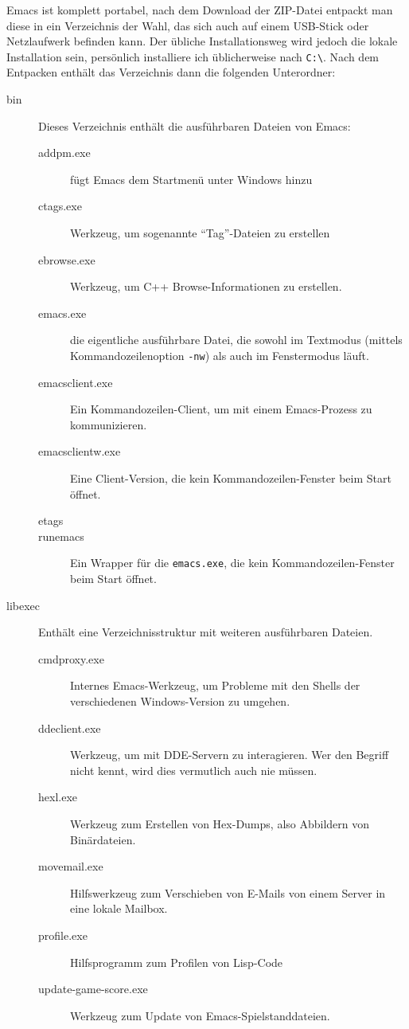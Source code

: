 \documentclass[12pt,ngerman]{scrbook}
\begin{document}
Emacs ist komplett portabel, nach dem Download der ZIP-Datei entpackt man diese in ein Verzeichnis der Wahl, das sich auch auf einem USB-Stick oder Netzlaufwerk befinden kann.
Der übliche Installationsweg wird jedoch die lokale Installation sein, persönlich installiere ich üblicherweise nach \texttt{C:\textbackslash}. Nach dem Entpacken enthält das Verzeichnis dann die folgenden Unterordner:

\begin{description}
\item[bin] Dieses Verzeichnis enthält die ausführbaren Dateien von Emacs:

\begin{description}
\item[addpm.exe] fügt Emacs dem Startmenü unter Windows hinzu
\item[ctags.exe] Werkzeug, um sogenannte \enquote{Tag}-Dateien zu erstellen 
\item[ebrowse.exe] Werkzeug, um C++ Browse-Informationen zu erstellen.
\item[emacs.exe] die eigentliche ausführbare Datei, die sowohl im Textmodus (mittels Kommandozeilenoption \texttt{-nw}) als auch im Fenstermodus läuft. 
\item[emacsclient.exe] Ein Kommandozeilen-Client, um mit einem Emacs-Prozess zu kommunizieren.
\item[emacsclientw.exe] Eine Client-Version, die kein Kommandozeilen-Fenster beim Start öffnet.
\item[etags]
\item[runemacs] Ein Wrapper für die \texttt{emacs.exe}, die kein Kommandozeilen-Fenster beim Start öffnet.
\end{description}


\item[libexec] Enthält eine Verzeichnisstruktur mit weiteren ausführbaren Dateien.

\begin{description}
\item[cmdproxy.exe] Internes Emacs-Werkzeug, um Probleme mit den Shells der verschiedenen Windows-Version zu umgehen.
\item[ddeclient.exe] Werkzeug, um mit DDE-Servern zu interagieren. Wer den Begriff nicht kennt, wird dies vermutlich auch nie müssen.
\item[hexl.exe] Werkzeug zum Erstellen von Hex-Dumps, also Abbildern von Binärdateien.
\item[movemail.exe] Hilfswerkzeug zum Verschieben von E-Mails von einem Server in eine lokale Mailbox.
\item[profile.exe] Hilfsprogramm zum Profilen von Lisp-Code
\item[update-game-score.exe] Werkzeug zum Update von Emacs-Spielstanddateien.
\end{description}


\end{description}
\end{document}
